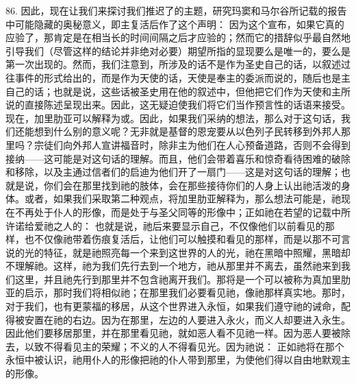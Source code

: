 86. 因此，现在让我们来探讨我们推迟了的主题，研究玛窦和马尔谷所记载的报告中可能隐藏的奥秘意义，即主复活后作了这个声明：  因为这个宣布，如果它真的应验了，那肯定是在相当长的时间间隔之后才应验的；然而它的措辞似乎最自然地引导我们（尽管这样的结论并非绝对必要）期望所指的显现要么是唯一的，要么是第一次出现的。然而，我们注意到，所涉及的话不是作为圣史自己的话，以叙述过往事件的形式给出的，而是作为天使的话，天使是奉主的委派而说的，随后也是主自己的话；也就是说，这些话被圣史用在他的叙述中，但他把它们作为天使和主所说的直接陈述呈现出来。因此，这无疑迫使我们将它们当作预言性的话语来接受。现在，加里肋亚可以解释为或。因此，如果我们采纳的想法，那么对于这句话，我们还能想到什么别的意义呢？无非就是基督的恩宠要从以色列子民转移到外邦人那里吗？宗徒们向外邦人宣讲福音时，除非主为他们在人心预备道路，否则不会得到接纳——这可能是对这句话的理解。而且，他们会带着喜乐和惊奇看待困难的破除和移除，以及主通过信者们的启迪为他们开了一扇门——这是对这句话的理解；也就是说，你们会在那里找到祂的肢体，会在那些接待你们的人身上认出祂活泼的身体。或者，如果我们采取第二种观点，将加里肋亚解释为，那么想法可能是，祂现在不再处于仆人的形像，而是处于与圣父同等的形像中；正如祂在若望的记载中所许诺给爱祂之人的： 也就是说，祂后来要显示自己，不仅像他们以前看见的那样，也不仅像祂带着伤痕复活后，让他们可以触摸和看见的那样，而是以那不可言说的光的特征，就是祂照亮每一个来到这世界的人的光，祂在黑暗中照耀，黑暗却不理解祂。这样，祂为我们先行去到一个地方，祂从那里并不离去，虽然祂来到我们这里，并且祂先行到那里并不包含祂离开我们。那将是一个可以被称为真加里肋亚的启示，那时我们将相似祂；在那里我们必要看见祂，像祂那样真实地。那时，对于我们，也有更蒙福的移居，从这个世界进入永恒，如果我们遵守祂的诫命，配得被安置在祂的右边。因为在那里，左边的人要进入永火，而义人却要进入永生。因此他们要移居那里，并在那里看见祂，就如恶人看不见祂一样。因为恶人要被除去，以致不得看见主的荣耀；不义的人不得看见光。因为祂说： 正如祂将在那个永恒中被认识，祂用仆人的形像把祂的仆人带到那里，为使他们得以自由地默观主的形像。\par


